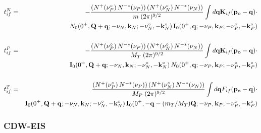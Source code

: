 \begin{eqnarray}\label{Q:tn_if-eval-form}
t^{N}_{if}&=& -\frac{\left( N^{+}(\nu_{P}^{\circ})\,N^{-*}(\nu_{P}) \right)
\left( N^{+}(\nu_{N}^{\circ})\,N^{-*}(\nu_{N}) \right)}{m \; (2 \pi)^{9/2}}
\int d \mathbf{q} \mathbf{K}_{if}(\mathbf{p_{o}}- \mathbf{q}) \cdot
  \\
&& N_{0}(0^{+}, \mathbf{Q} + \mathbf{q}; -\nu_{N}, \mathbf{k}_{N}; -\nu_{N}^{\circ},
-\mathbf{k}_{N}^{\circ} ) \, \mathbf{I}_{0}( 0^{+} , \mathbf{q};-\nu_{P},\mathbf{k}_{P};
-\nu_{P}^{\circ}, -\mathbf{k}_{P}^{\circ}) \nonumber
\\
\nonumber \\
t^{P}_{if}&=& -\frac{\left( N^{+}(\nu_{P}^{\circ})\,N^{-*}(\nu_{P}) \right)
\left( N^{+}(\nu_{N}^{\circ})\,N^{-*}(\nu_{N}) \right)}{M_{T} \; (2
\pi)^{9/2}} \int d \mathbf{q} \mathbf{K}_{if}(\mathbf{p_{o}}- \mathbf{q}) \cdot
  \\
&& \mathbf{I}_{0}(0^{+}, \mathbf{Q} + \mathbf{q}; -\nu_{N}, \mathbf{k}_{N} ; -\nu_{N}^{\circ},
-\mathbf{k}_{N}^{\circ}) \, N_{0}( 0^{+} , \mathbf{q};-\nu_{P},\mathbf{k}_{P}; -\nu_{P}^{\circ},
-\mathbf{k}_{P}^{\circ}) \nonumber
\\
\nonumber \\
t^{T}_{if}&=& \frac{\left( N^{+}(\nu_{P}^{\circ})\,N^{-*}(\nu_{P}) \right)
\left( N^{+}(\nu_{N}^{\circ})\,N^{-*}(\nu_{N}) \right)}{M_{P} \; (2
\pi)^{9/2}} \int d \mathbf{q} F_{if}(\mathbf{p_{o}}- \mathbf{q}) \cdot
  \\
&& \mathbf{I}_{0}(0^{+}, \mathbf{Q} + \mathbf{q}; -\nu_{N}, \mathbf{k}_{N}; -\nu_{N}^{\circ},
-\mathbf{k}_{N}^{\circ} ) \, \mathbf{I}_{0}( 0^{+} , -\mathbf{q} - (m_{T}/M_{T})\mathbf{Q} ; -
\nu_{P}, \mathbf{k}_{P}; -\nu_{P}^{\circ}, - \mathbf{k}_{P}^{\circ} ) \nonumber
\end{eqnarray}

\subsubsection{CDW-EIS}

